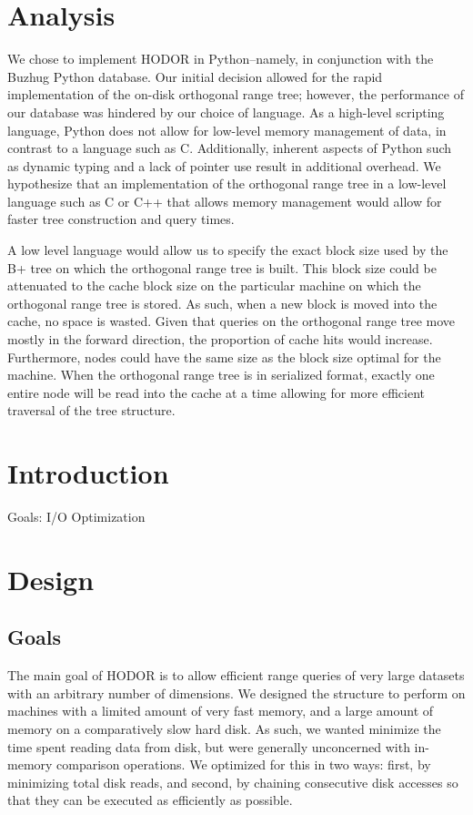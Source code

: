 \documentclass[11pt, oneside]{article}
\begin{document}
\section{Analysis}

We chose to implement HODOR in Python--namely, in conjunction with the Buzhug Python database. Our initial decision allowed for the rapid implementation of the on-disk orthogonal range tree; however, the performance of our database was hindered by our choice of language. As a high-level scripting language, Python does not allow for low-level memory management of data, in contrast to a language such as C. Additionally, inherent aspects of Python such as dynamic typing and a lack of pointer use result in additional overhead. We hypothesize that an implementation of the orthogonal range tree in a low-level language such as C or C++ that allows memory management would allow for faster tree construction and query times. 

A low level language would allow us to specify the exact block size used by the B+ tree on which the orthogonal range tree is built. This block size could be attenuated to the cache block size on the particular machine on which the orthogonal range tree is stored. As such, when a new block is moved into the cache, no space is wasted. Given that queries on the orthogonal range tree move mostly in the forward direction, the proportion of cache hits would increase. Furthermore, nodes could have the same size as the block size optimal for the machine. When the orthogonal range tree is in serialized format, exactly one entire node will be read into the cache at a time allowing for more efficient traversal of the tree structure.









\section{Introduction}
Goals:
	I/O Optimization


\section{Design}

\subsection{Goals}
The main goal of HODOR is to allow efficient range queries of very large
datasets with an arbitrary number of dimensions. We designed the structure to
perform on machines with a limited amount of very fast memory, and a large
amount of memory on a comparatively slow hard disk. As such, we wanted minimize
the time spent reading data from disk, but were generally unconcerned with
in-memory comparison operations. We optimized for this in two ways: first, by
minimizing total disk reads, and second, by chaining consecutive disk accesses
so that they can be executed as efficiently as possible. 
\end{document}

